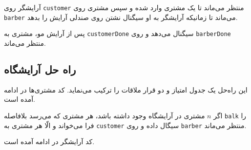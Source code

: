 \documentclass{book}
\newcommand{\clearemptydoublepage}{\newpage\cleardoublepage}
\begin{document}
    آرایشگر روی {\tt customer} منتظر می‌ماند تا یک مشتری وارد شده و سپس مشتری روی  {\tt barber} می‌ماند تا زمانیکه آرایشگر 
    به او سیگنال نشتن روی صندلی آرایش را بدهد. 

    پس از آرایش مو، مشتری به  {\tt customerDone}  سیگنال می‌دهد و روی {\tt barberDone} منتظر می‌ماند. 

\clearemptydoublepage
\subsection{راه حل آرایشگاه}

    این راه‌حل یک جدول امتیاز و دو قرار ملاقات را ترکیب می‌نماید. کد مشتری‌ها در ادامه آمده است. 

\begin{latin}
%

\end{latin}

    اگر  $n$ مشتری در آرایشگاه وجود داشته باشد، هر مشتری که می‌رسد بلافاصله {\tt balk} را فرا می‌خواند و الّا هر مشتری به {\tt customer}
    سیگال داده و روی {\tt barber} منتظر می‌ماند. 

    کد آرایشگر در ادامه آمده است. 

\begin{latin}
%

\end{latin}
\end{document}
